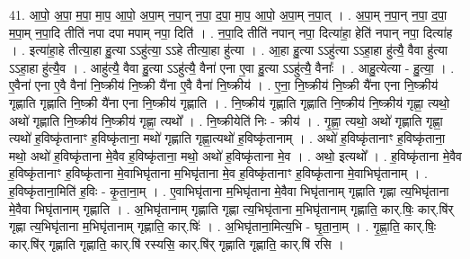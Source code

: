 \documentclass[17pt]{extarticle}
\begin{document}
41. आ॒पो॒ अ॒पा॒ म॒पा॒ मा॒प॒ आ॒पो॒ अ॒पा॒म् न॒पा॒न् न॒पा॒ द॒पा॒ मा॒प॒ आ॒पो॒ अ॒पा॒म् न॒पा॒त् । . अ॒पा॒म् न॒पा॒न् न॒पा॒ द॒पा॒ म॒पा॒म् न॒पा॒दि तीति॑ नपा दपा मपाम् नपा॒ दिति॑ । . न॒पा॒दि तीति॑ नपान् नपा॒ दित्या॑हा॒ हेति॑ नपान् नपा॒ दित्या॑ह । . इत्या॑हा॒हे तीत्या॒हा हु॒त्या ऽऽहु॑त्या॒ ऽऽहे तीत्या॒हा हु॑त्या । . आ॒हा हु॒त्या ऽऽहु॑त्या ऽऽहा॒हा हु॑त्यै॒ वैवा हु॑त्या ऽऽहा॒हा हु॑त्यै॒व । . आहु॑त्यै॒ वैवा हु॒त्या ऽऽहु॑त्यै॒ वैना॑ एना ए॒वा हु॒त्या ऽऽहु॑त्यै॒ वैनाः᳚ । . आहु॒त्येत्या - हु॒त्या॒ । . ए॒वैना॑ एना ए॒वै वैना॑ नि॒ष्क्रीय॑ नि॒ष्क्री यै॑ना ए॒वै वैना॑ नि॒ष्क्रीय॑ । . ए॒ना॒ नि॒ष्क्रीय॑ नि॒ष्क्री यै॑ना एना नि॒ष्क्रीय॑ गृह्णाति गृह्णाति नि॒ष्क्री यै॑ना एना नि॒ष्क्रीय॑ गृह्णाति । . नि॒ष्क्रीय॑ गृह्णाति गृह्णाति नि॒ष्क्रीय॑ नि॒ष्क्रीय॑ गृह्णा॒ त्यथो॒ अथो॑ गृह्णाति नि॒ष्क्रीय॑ नि॒ष्क्रीय॑ गृह्णा॒ त्यथो᳚ । . नि॒ष्क्रीयेति॑ निः - क्रीय॑ । . गृ॒ह्णा॒ त्यथो॒ अथो॑ गृह्णाति गृह्णा॒ त्यथो॑ ह॒विष्कृ॑तानाꣳ ह॒विष्कृ॑ताना॒ मथो॑ गृह्णाति गृह्णा॒त्यथो॑ ह॒विष्कृ॑तानाम् । . अथो॑ ह॒विष्कृ॑तानाꣳ ह॒विष्कृ॑ताना॒ मथो॒ अथो॑ ह॒विष्कृ॑ताना मे॒वैव ह॒विष्कृ॑ताना॒ मथो॒ अथो॑ ह॒विष्कृ॑ताना मे॒व । . अथो॒ इत्यथो᳚ । . ह॒विष्कृ॑ताना मे॒वैव ह॒विष्कृ॑तानाꣳ ह॒विष्कृ॑ताना मे॒वाभिघृ॑ताना म॒भिघृ॑ताना मे॒व ह॒विष्कृ॑तानाꣳ ह॒विष्कृ॑ताना मे॒वाभिघृ॑तानाम् । . ह॒विष्कृ॑ताना॒मिति॑ ह॒विः - कृ॒ता॒ना॒म् । . ए॒वाभिघृ॑ताना म॒भिघृ॑ताना मे॒वैवा भिघृ॑तानाम् गृह्णाति गृह्णा त्य॒भिघृ॑ताना मे॒वैवा भिघृ॑तानाम् गृह्णाति । . अ॒भिघृ॑तानाम् गृह्णाति गृह्णा त्य॒भिघृ॑ताना म॒भिघृ॑तानाम् गृह्णाति॒ कार्.षिः॒ कार्.षि॑र् गृह्णा त्य॒भिघृ॑ताना म॒भिघृ॑तानाम् गृह्णाति॒ कार्.षिः॑ । . अ॒भिघृ॑ताना॒मित्य॒भि - घृ॒ता॒ना॒म् । . गृ॒ह्णा॒ति॒ कार्.षिः॒ कार्.षि॑र् गृह्णाति गृह्णाति॒ कार्.षि॑ रस्यसि॒ कार्.षि॑र् गृह्णाति गृह्णाति॒ कार्.षि॑ रसि । \newline
\pagebreak
{}
\end{document}
